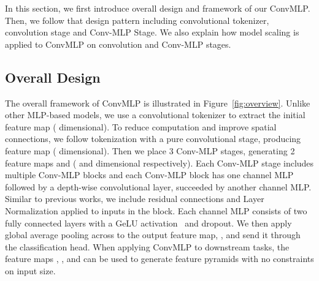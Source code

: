 \documentclass[final]{cvpr}
\begin{document}
\begin{table*}[!ht]
\centering
{}

\caption{Ablation study on ImageNet-1k validation set. All experiments are based on ConvMLP-S.  denotes slightly modified Conv Stage with improved accuracy in the long run which is used in our final ConvMLP-S model.}
\label{tab:ablation}
\end{table*} In this section, we first introduce overall design and framework of our ConvMLP. Then, we follow that design pattern including convolutional tokenizer, convolution stage and Conv-MLP Stage. We also explain how model scaling is applied to ConvMLP on convolution and Conv-MLP stages.

\subsection{Overall Design}
The overall framework of ConvMLP is illustrated in Figure~\ref{fig:overview}. Unlike other MLP-based models, we use a convolutional tokenizer to extract the initial feature map  ( dimensional). To reduce computation and improve spatial connections, we follow tokenization with a pure convolutional stage, producing feature map  ( dimensional). Then we place 3 Conv-MLP stages, generating 2 feature maps  and  ( and  dimensional respectively). Each Conv-MLP stage includes multiple Conv-MLP blocks and each Conv-MLP block has one channel MLP followed by a depth-wise convolutional layer, succeeded by another channel MLP. Similar to previous works, we include residual connections and Layer Normalization applied to inputs in the block. Each channel MLP consists of two fully connected layers with a GeLU activation~\cite{hendrycks2016gaussian} and dropout. We then apply global average pooling across to the output feature map, , and send it through the classification head. When applying ConvMLP to downstream tasks, the feature maps , ,  and  can be used to generate feature pyramids with no constraints on input size.
\end{document}
